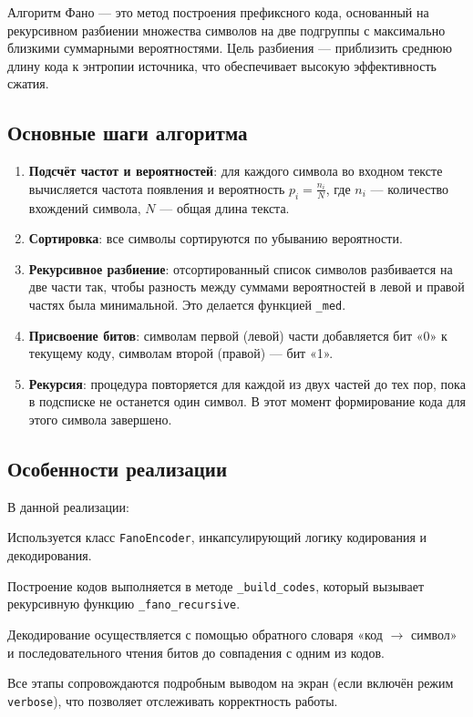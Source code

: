 \documentclass[a4paper,12pt]{article}
\begin{document}
Алгоритм Фано — это метод построения префиксного кода, основанный на рекурсивном разбиении множества символов на две подгруппы с максимально близкими суммарными вероятностями. Цель разбиения — приблизить среднюю длину кода к энтропии источника, что обеспечивает высокую эффективность сжатия.

\subsection{Основные шаги алгоритма}

\begin{enumerate}
    \item \textbf{Подсчёт частот и вероятностей}: для каждого символа во входном тексте вычисляется частота появления и вероятность $p_i = \frac{n_i}{N}$, где $n_i$ — количество вхождений символа, $N$ — общая длина текста.
    
    \item \textbf{Сортировка}: все символы сортируются по убыванию вероятности.
    
    \item \textbf{Рекурсивное разбиение}: отсортированный список символов разбивается на две части так, чтобы разность между суммами вероятностей в левой и правой частях была минимальной. Это делается функцией \texttt{\_med}.
    
    \item \textbf{Присвоение битов}: символам первой (левой) части добавляется бит «0» к текущему коду, символам второй (правой) — бит «1».
    
    \item \textbf{Рекурсия}: процедура повторяется для каждой из двух частей до тех пор, пока в подсписке не останется один символ. В этот момент формирование кода для этого символа завершено.
\end{enumerate}

\subsection{Особенности реализации}

В данной реализации:
\item Используется класс \texttt{FanoEncoder}, инкапсулирующий логику кодирования и декодирования.
    \item Построение кодов выполняется в методе \texttt{\_build\_codes}, который вызывает рекурсивную функцию \texttt{\_fano\_recursive}.
    \item Декодирование осуществляется с помощью обратного словаря «код $\rightarrow$ символ» и последовательного чтения битов до совпадения с одним из кодов.
    \item Все этапы сопровождаются подробным выводом на экран (если включён режим \texttt{verbose}), что позволяет отслеживать корректность работы.
\end{document}

